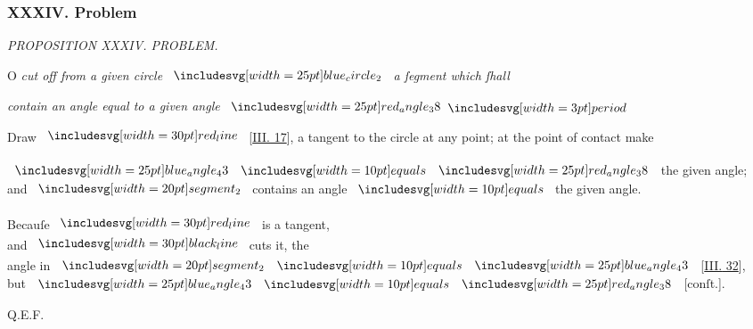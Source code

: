 \documentclass[11pt,preview]{standalone}
\begin{document}
\subsubsection{XXXIV. Problem}

\begin{minipage}[t]{0.54\textwidth}
    \begin{center}
        \textit{PROPOSITION XXXIV. PROBLEM.}\label{book3pr34} \\
    \end{center}

    \hfill

    \begin{center}
        \raggedright \lettrine[lines=3, loversize=1, nindent=0pt]{}{}O \textit{cut off from a given circle} $\img{blue_circle_2}$ \textit{a ſegment which ſhall}
    \end{center}
    \textit{contain an angle equal to a given angle} $\img{red_angle_38} \bperiod$
\end{minipage}%
\hfill
\begin{minipage}[t]{0.43\textwidth}
    \vspace{20pt}
    
\end{minipage}%

\hfill

\hfill

\raggedright Draw $\redline$ [\hyperref[book3pr17]{\textsc{III.} 17}], a tangent to the circle at any point; at the point of contact make

\hfill

\begin{center}
    $\img{blue_angle_43} \bequals \img{red_angle_38}$ the given angle;\\
    and $\img[0][0][20]{segment_2}$ contains an angle $\bequals$ the given angle.\\
    \hfill\\
    Becauſe $\redline$ is a tangent,\\
    and $\blackline$ cuts it, the\\
    angle in $\img[0][0][20]{segment_2} \bequals \img{blue_angle_43}$ [\hyperref[book3pr22]{\textsc{III.} 32}],\\
    but $\img{blue_angle_43} \bequals \img{red_angle_38}$ [conſt.].
\end{center}

\hfill

\hfill Q.E.F.
\end{document}
